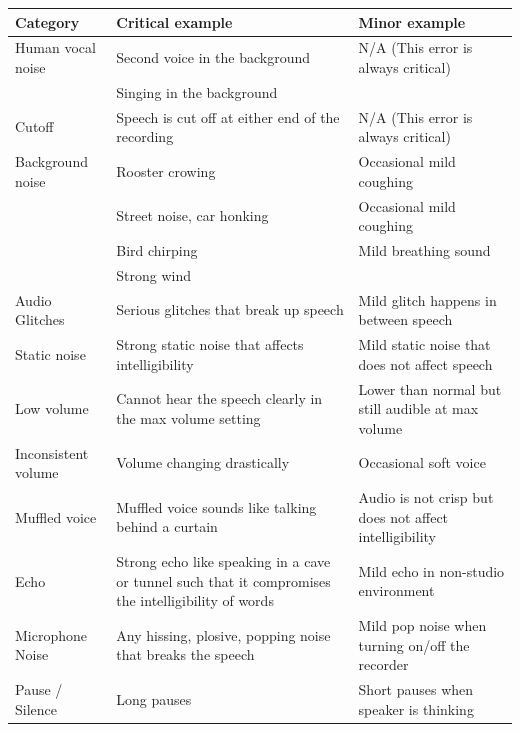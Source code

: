 \begin{table}[!ht]
    \centering
    \begin{tabular}{p{3cm}p{6cm}p{6cm}}
    \toprule
     \textbf{Category}  & \textbf{Critical example} & \textbf{Minor example} \\
     \midrule
     \small{Human vocal noise} & \small{Second voice in the background} & \small{N/A (This error is always critical)} \\
     & \small{Singing in the background} &  \\
    \midrule
    \small{Cutoff} & \small{Speech is cut off at either end of the recording} &  \small{N/A (This error is always critical)}\\
     \midrule
     \small{Background noise} & \small{Rooster crowing} & \small{Occasional mild coughing} \\
     & \small{Street noise, car honking} & \small{Occasional mild coughing} \\
     & \small{Bird chirping} & \small{Mild breathing sound}\\
     & \small{Strong wind} & \\
     \midrule
\small{Audio Glitches} & \small{Serious glitches that break up speech} & \small{Mild glitch happens in between speech} \\
\midrule
\small{Static noise} & \small{Strong static noise that affects intelligibility} & \small{Mild static noise that does not affect speech} \\
\midrule
\small{Low volume} & \small{Cannot hear the speech clearly in the max volume setting} & \small{Lower than normal but still audible at max volume} \\
\midrule
\small{Inconsistent volume} & \small{Volume changing drastically} & \small{Occasional soft voice} \\
\midrule
\small{Muffled voice} & \small{Muffled voice sounds like talking behind a curtain} & \small{Audio is not crisp but does not affect intelligibility} \\
\midrule
\small{Echo} & \small{Strong echo like speaking in a cave or tunnel such that it compromises the intelligibility of words} & \small{Mild echo in non-studio environment} \\
\midrule
\small{Microphone Noise} & \small{Any hissing, plosive, popping noise that breaks the speech} & \small{Mild pop noise when turning on/off the recorder} \\
\midrule
\small{Pause / Silence} & \small{Long pauses} & \small{Short pauses when speaker is thinking} \\

\end{tabular}
\end{table}

